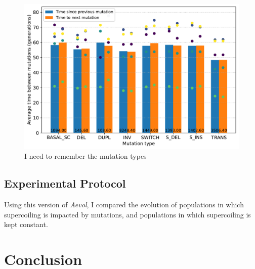 \begin{figure}[H]
\includegraphics[width=\textwidth]{aevol/images/with_sc_mut_time_150k_995k.pdf}
\caption{I need to remember the mutation types}
\end{figure}

\subsection{Experimental Protocol}

Using this version of \emph{Aevol}, I compared the evolution of populations in which supercoiling is impacted by mutations, and populations in which supercoiling is kept constant.


\section{Conclusion}
\label{sec:aevol_ccl}